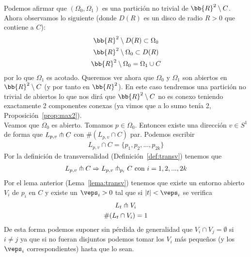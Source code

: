 Podemos afirmar que $(\Omega_0,\Omega_1)$ es una partición no trivial de $\bb{R}^2 \setminus C$. Ahora observamos lo siguiente (donde $D(R)$ es un disco de radio $R>0$ que contiene a $C$):
\begin{gather*}
    \bb{R}^2 \setminus D(R) \subset \Omega_0\\
    \bb{R}^2 \setminus \Omega_0 \subset D(R)\\
    \bb{R}^2 \setminus \Omega_0 = \Omega_1 \cup C
\end{gather*}
por lo que $\Omega_1$ es acotado. Queremos ver ahora que $\Omega_0$ y $\Omega_1$ son abiertos en $\bb{R}^2 \setminus C$ (y por tanto en $\bb{R}^2$). En este caso tendremos una partición no trivial de abiertos lo que nos dirá que $\bb{R}^2 \setminus C$ no es conexo teniendo exactamente 2 componentes conexas (ya vimos que a lo sumo tenía 2, Proposición~\ref{prop:max2}).\\

Veamos que $\Omega_0$ es abierto. Tomamos $p\in \Omega_0$. Entonces existe una dirección $v\in S^1$ de forma que $L_{p,v} \pitchfork C$ con $\#(L_{p,v} \cap C)$ par. Podemos escribir
\begin{gather*}
    L_{p,v}\cap C = \{p_1,p_2,...,p_{2k}\}
\end{gather*}
Por la definición de transversalidad (Definición~\ref{def:transv}) tenemos que 
\begin{gather*}
    L_{p,v}\pitchfork C \Rightarrow L_{p,v}\pitchfork _{p_i} C \text{ con } i=1,2,...,2k
\end{gather*}
Por el lema anterior (Lema~\ref{lema:transv}) tenemos que existe un entorno abierto $V_i$ de $p_i$ en $C$ y existe un $\veps_i>0$ tal que si $|t|< \veps_i$ se verifica
\begin{gather*}
    L_t\pitchfork V_i\\
    \#(L_t \cap V_i) = 1
\end{gather*}
De esta forma podemos suponer sin pérdida de generalidad que $V_i\cap V_j= \emptyset$ si $i\neq j$ ya que si no fueran disjuntos podemos tomar los $V_i$ más pequeños (y los $\veps_i$ correspondientes) hasta que lo sean.\\

